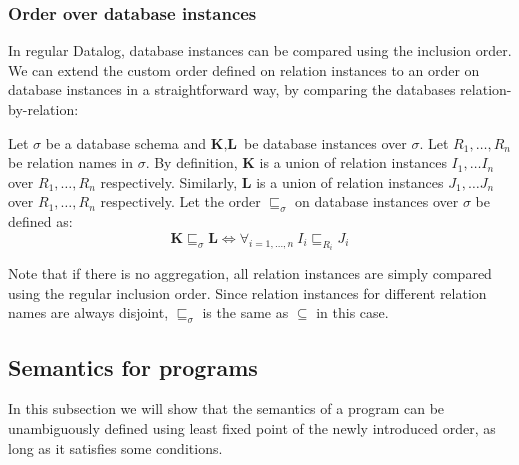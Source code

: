 \subsubsection{Order over database instances}

In regular Datalog, database instances can be compared using the inclusion order. We can extend the custom order defined on relation instances to an order on database instances in a straightforward way, by comparing the databases relation-by-relation:

\begin{defn}
Let $\sigma$ be a database schema and $\textbf{K}, \textbf{L}$ be database instances over $\sigma$. Let $R_1, \dots, R_n$ be relation names in $\sigma$. By definition, $\textbf{K}$ is a union of relation instances $I_1, \dots I_n$ over $R_1, \dots, R_n$ respectively. Similarly, $\textbf{L}$ is a union of relation instances $J_1, \dots J_n$ over $R_1, \dots, R_n$ respectively.  Let the order $\sqsubseteq_\sigma$ on database instances over $\sigma$ be defined as:
$$\textbf{K} \sqsubseteq_\sigma \textbf{L} \iff \forall_{i=1, \dots, n}~I_i \sqsubseteq_{R_i} J_i$$
\end{defn}

\begin{rem}
Note that if there is no aggregation, all relation instances are simply compared using the regular inclusion order. Since relation instances for different relation names are always disjoint, $\sqsubseteq_\sigma$ is the same as $\subseteq$ in this case.
\end{rem}

\subsection{Semantics for \datalogra programs}\label{ss:semdra}
In this subsection we will show that the semantics of a \datalogra program can be unambiguously defined using least fixed point of the newly introduced order, as long as it satisfies some conditions. 



